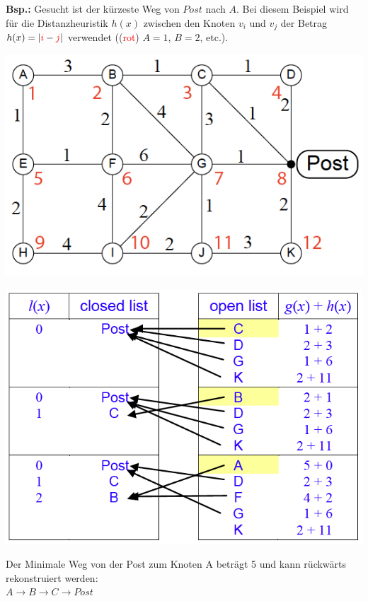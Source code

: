 \textbf{Bsp.:} Gesucht ist der kürzeste Weg von $Post$ nach $A$.
Bei diesem Beispiel wird für die Distanzheuristik $h(x)$ zwischen den Knoten $v_i$ und $v_j$ der Betrag $h(x)=|\textcolor{red}{i}-\textcolor{red}{j}|$ verwendet ((\textcolor{red}{rot}) $A=1$, $B=2$, etc.).

\begin{minipage}{0.5\textwidth}
	\includegraphics[width=\textwidth]{Content/Graphen/PostAStar.png}
\end{minipage}
\begin{minipage}{0.5\textwidth}
	\includegraphics[width=\textwidth]{Content/Graphen/AStar.png}
\end{minipage}

Der Minimale Weg von der Post zum Knoten A beträgt 5 und kann rückwärts rekonstruiert werden:\\ $A\rightarrow B\rightarrow C \rightarrow Post$\\

